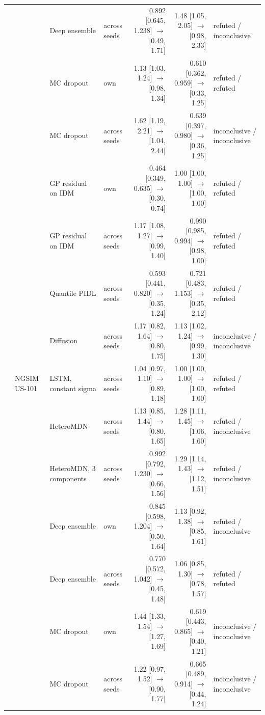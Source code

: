 \begin{longtable}{llllrrl}
 &  & Deep ensemble & across seeds & 0.892 [0.645, 1.238] $\rightarrow$ [0.49, 1.71] & 1.48 [1.05, 2.05] $\rightarrow$ [0.98, 2.33] & refuted / inconclusive \\
 &  & MC dropout & own & 1.13 [1.03, 1.24] $\rightarrow$ [0.98, 1.34] & 0.610 [0.362, 0.959] $\rightarrow$ [0.33, 1.25] & refuted / refuted \\
 &  & MC dropout & across seeds & 1.62 [1.19, 2.21] $\rightarrow$ [1.04, 2.44] & 0.639 [0.397, 0.980] $\rightarrow$ [0.36, 1.25] & inconclusive / inconclusive \\
 &  & GP residual on IDM & own & 0.464 [0.349, 0.635] $\rightarrow$ [0.30, 0.74] & 1.00 [1.00, 1.00] $\rightarrow$ [1.00, 1.00] & refuted / refuted \\
 &  & GP residual on IDM & across seeds & 1.17 [1.08, 1.27] $\rightarrow$ [0.99, 1.40] & 0.990 [0.985, 0.994] $\rightarrow$ [0.98, 1.00] & refuted / refuted \\
 &  & Quantile PIDL & across seeds & 0.593 [0.441, 0.820] $\rightarrow$ [0.35, 1.24] & 0.721 [0.483, 1.153] $\rightarrow$ [0.35, 2.12] & refuted / refuted \\
 &  & Diffusion & across seeds & 1.17 [0.82, 1.64] $\rightarrow$ [0.80, 1.75] & 1.13 [1.02, 1.24] $\rightarrow$ [0.99, 1.30] & inconclusive / inconclusive \\
\midrule
 & NGSIM US-101 & LSTM, constant sigma & across seeds & 1.04 [0.97, 1.10] $\rightarrow$ [0.89, 1.18] & 1.00 [1.00, 1.00] $\rightarrow$ [1.00, 1.00] & refuted / refuted \\
 &  & HeteroMDN & across seeds & 1.13 [0.85, 1.44] $\rightarrow$ [0.80, 1.65] & 1.28 [1.11, 1.45] $\rightarrow$ [1.06, 1.60] & refuted / inconclusive \\
 &  & HeteroMDN, 3 components & across seeds & 0.992 [0.792, 1.230] $\rightarrow$ [0.66, 1.56] & 1.29 [1.14, 1.43] $\rightarrow$ [1.12, 1.51] & refuted / inconclusive \\
 &  & Deep ensemble & own & 0.845 [0.598, 1.204] $\rightarrow$ [0.50, 1.64] & 1.13 [0.92, 1.38] $\rightarrow$ [0.85, 1.61] & refuted / inconclusive \\
 &  & Deep ensemble & across seeds & 0.770 [0.572, 1.042] $\rightarrow$ [0.45, 1.48] & 1.06 [0.85, 1.30] $\rightarrow$ [0.78, 1.57] & refuted / refuted \\
 &  & MC dropout & own & 1.44 [1.33, 1.54] $\rightarrow$ [1.27, 1.69] & 0.619 [0.443, 0.865] $\rightarrow$ [0.40, 1.21] & inconclusive / inconclusive \\
 &  & MC dropout & across seeds & 1.22 [0.97, 1.52] $\rightarrow$ [0.90, 1.77] & 0.665 [0.489, 0.914] $\rightarrow$ [0.44, 1.24] & inconclusive / inconclusive \\

\end{longtable}
